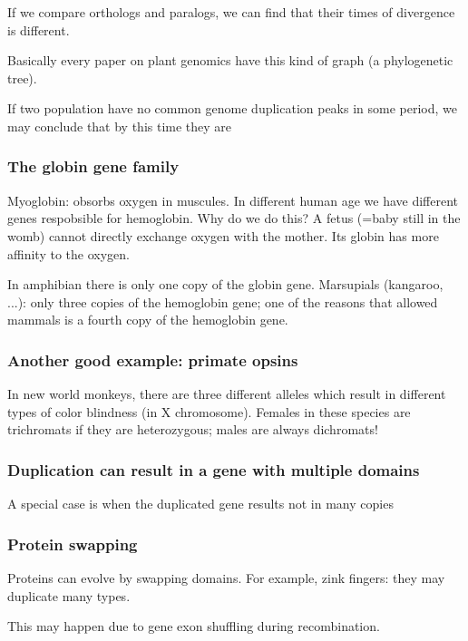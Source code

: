 \documentclass[main.tex]{subfiles}
\begin{document}
If we compare orthologs and paralogs, we can find that their times of divergence is different.

Basically every paper on plant genomics have this kind of graph (a phylogenetic tree).

If two population have no common genome duplication peaks in some period, we may conclude that  by this time they are 

\subsubsection{ The globin gene family }

Myoglobin: obsorbs oxygen in muscules.
In different human age we have different genes respobsible for hemoglobin.
Why do we do this?
A fetus (=baby still in the womb) cannot directly exchange oxygen with the mother.
Its globin has more affinity to the oxygen.

In amphibian there is only one copy of the globin gene.
Marsupials (kangaroo, ...): only three copies of the hemoglobin gene; %
one of the reasons that allowed mammals is a fourth copy of the hemoglobin gene.

\subsubsection{Another good example: primate opsins}

In new world monkeys, there are three different alleles which result in different types of color blindness (in X chromosome).
Females in these species are trichromats if they are heterozygous; males are always dichromats!

\subsubsection{Duplication can result in a gene with multiple domains}

A special case is when the duplicated gene results not in many copies

\subsubsection{Protein swapping}

Proteins can evolve by swapping domains.
For example, zink fingers: they may duplicate many types.

This may happen due to gene exon shuffling during recombination.
\end{document}
